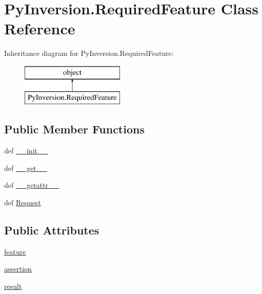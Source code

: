 \hypertarget{class_py_inversion_1_1_required_feature}{\section{Py\+Inversion.\+Required\+Feature Class Reference}
\label{class_py_inversion_1_1_required_feature}
}
Inheritance diagram for Py\+Inversion.\+Required\+Feature\+:\begin{figure}[H]
\begin{center}
\leavevmode
\includegraphics[height=2.000000cm]{class_py_inversion_1_1_required_feature}
\end{center}
\end{figure}
\subsection*{Public Member Functions}
\begin{DoxyCompactItemize}
\item 
def \hyperlink{class_py_inversion_1_1_required_feature_a375929df7e69c3007cca55f16734fea6}{\+\_\+\+\_\+init\+\_\+\+\_\+}
\item 
def \hyperlink{class_py_inversion_1_1_required_feature_a7d80a58ed26e163ce5378d4c85b30acf}{\+\_\+\+\_\+get\+\_\+\+\_\+}
\item 
def \hyperlink{class_py_inversion_1_1_required_feature_aa80602fe78081b4b4397ea2525b1f8ed}{\+\_\+\+\_\+getattr\+\_\+\+\_\+}
\item 
def \hyperlink{class_py_inversion_1_1_required_feature_a6b5ba6d11ef85d9295a567a441e8432a}{Request}
\end{DoxyCompactItemize}
\subsection*{Public Attributes}
\begin{DoxyCompactItemize}
\item 
\hyperlink{class_py_inversion_1_1_required_feature_a9d27890fe52489cae6ba6e692e856c33}{feature}
\item 
\hyperlink{class_py_inversion_1_1_required_feature_aa20d4e8ea16793c413631def7daf0caf}{assertion}
\item 
\hyperlink{class_py_inversion_1_1_required_feature_a3cc2960e714d44ebf6c440ff99aedbf5}{result}
\end{DoxyCompactItemize}


